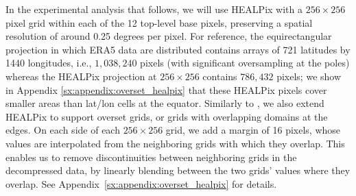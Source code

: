 In the experimental analysis that follows, we will use HEALPix with a $256 \times 256$ pixel grid within each of the 12 top-level base pixels, preserving a spatial resolution of around 0.25 degrees per pixel. For reference, the equirectangular projection in which ERA5 data are distributed contains arrays of 721 latitudes by 1440 longitudes, i.e., $1,038,240$ pixels (with significant oversampling at the poles) whereas the HEALPix projection at $256 \times 256$ contains $786,432$ pixels; we show in Appendix \ref{sx:appendix:overset_healpix} that these HEALPix pixels cover smaller areas than lat/lon cells at the equator.
Similarly to \cite{karlbauer2023advancing}, we also extend HEALPix to support overset grids, or grids with overlapping domains at the edges. On each side of each $256 \times 256$ grid, we add a margin of 16 pixels, whose values are interpolated from the neighboring grids with which they overlap. This enables us to remove discontinuities between neighboring grids in the decompressed data, by linearly blending between the two grids' values where they overlap. See Appendix~\ref{sx:appendix:overset_healpix} for details.

